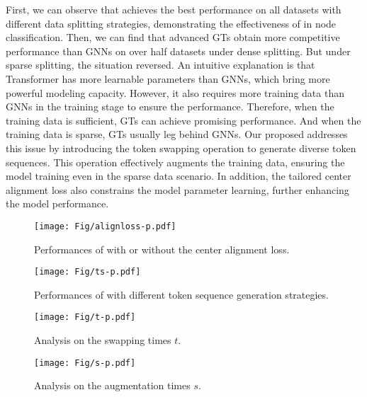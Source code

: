 First, we can observe that \name achieves the best performance on all datasets with different data splitting strategies, demonstrating the effectiveness of \name in node classification.
Then, we can find that advanced GTs obtain more competitive performance than GNNs on over half datasets under dense splitting.
But under sparse splitting, the situation reversed.
An intuitive explanation is that Transformer has more learnable parameters than GNNs, which bring more powerful modeling capacity.
However, it also requires more training data than GNNs in the training stage to ensure the performance.
Therefore, when the training data is sufficient, GTs can achieve promising performance.
And when the training data is sparse, GTs usually leg behind GNNs.
Our proposed \name addresses this issue by introducing the token swapping operation to generate diverse token sequences. 
This operation effectively augments the training data, ensuring the model training even in the sparse data scenario.
In addition, the tailored center alignment loss also constrains the model parameter learning, further enhancing the model performance.


\begin{figure}[t]
\centering
\texttt{[image: Fig/alignloss-p.pdf]}
\caption{
Performances of \name with or without the center alignment loss.
}
\label{fig:align}
\end{figure}

\begin{figure}[t]
\centering
\texttt{[image: Fig/ts-p.pdf]}
\caption{
Performances of \name with different token sequence generation strategies.}
\label{fig:ts}
\end{figure}

\begin{figure}[t]
\centering
\texttt{[image: Fig/t-p.pdf]}
\caption{
Analysis on the swapping times $t$.}
\label{fig:t}
\end{figure}

\begin{figure}[t]
\centering
\texttt{[image: Fig/s-p.pdf]}
\caption{
Analysis on the augmentation times $s$.}
\label{fig:s}
\end{figure}



